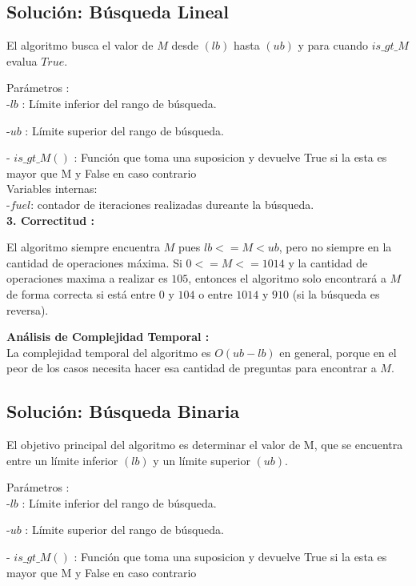 \documentclass[
10pt, %
a4paper, %
oneside, %
headinclude,footinclude, %
BCOR5mm, %
]{scrartcl}
\begin{document}
\subsection{Solución: Búsqueda Lineal}
El algoritmo busca el valor de $M$ desde $(lb)$ hasta $(ub)$ y para cuando $is\_gt\_M$ evalua $True$.

Parámetros :\\

-$lb$ : Límite inferior del rango de búsqueda.


-$ub$ : Límite superior del rango de búsqueda.


- $is\_gt\_M()$ : Función que toma una suposicion y devuelve True si la esta es mayor que M y False en caso contrario\\

Variables internas: \\

-$fuel$: contador de iteraciones realizadas dureante la búsqueda. \\

\textbf{3. Correctitud :} 

El algoritmo siempre encuentra $M$ pues $lb <= M < ub$, pero no siempre en la cantidad de operaciones máxima. Si
$0 <= M <= 1014$ y la cantidad de operaciones maxima a realizar es $105$, entonces el algoritmo solo encontrará a $M$
de forma correcta si está entre $0$ y $104$ o entre $1014$ y $910$ (si la búsqueda es reversa).

\textbf{Análisis de Complejidad Temporal :}\\

La complejidad temporal del algoritmo es $O (ub-lb)$ en general, porque en el peor de los casos necesita hacer
esa cantidad de preguntas para encontrar a $M$.

\subsection{Solución: Búsqueda Binaria}
El objetivo principal del algoritmo es determinar el valor de M, que se encuentra entre un límite inferior $(lb)$ y un límite superior $(ub)$. 

Parámetros :\\

-$lb$ : Límite inferior del rango de búsqueda.


-$ub$ : Límite superior del rango de búsqueda.


- $is\_gt\_M()$ : Función que toma una suposicion y devuelve True si la esta es mayor que M y False en caso contrario\\
\end{document}
